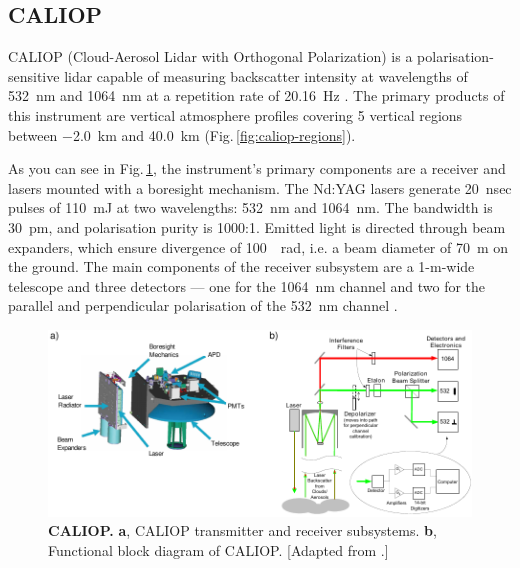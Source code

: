 \subsection{CALIOP}
CALIOP (Cloud-Aerosol Lidar with Orthogonal Polarization) is a
polarisation-sensitive lidar capable of measuring backscatter intensity at
wavelengths of \SI{532}{nm}
and \SI{1064}{nm} at a repetition rate of \SI{20.16}{Hz}
\citep{CALIPSO_Catalog2007}. The primary products of this instrument are
vertical atmosphere profiles covering 5 vertical regions between \SI{-2.0}{km} 
and \SI{40.0}{km} (Fig.\,\ref{fig:caliop-regions}).

As you can see in Fig.\,\ref{fig:caliop}, the instrument's primary components
are a receiver and lasers mounted with a boresight mechanism. The Nd:YAG lasers
generate \SI{20}{nsec} pulses of \SI{110}{mJ} at two wavelengths: \SI{532}{nm}
and \SI{1064}{nm}. The bandwidth is \SI{30}{pm}, and polarisation purity is
1000:1. Emitted light is directed through beam expanders, which ensure
divergence of \SI{100}{{\textmu}rad}, i.e. a beam diameter of \SI{70}{m} on the
ground. The main components of the receiver subsystem are a 1-m-wide telescope
and three detectors --- one for the \SI{1064}{nm} channel and two for the
parallel and perpendicular polarisation of the \SI{532}{nm} channel
\citep{PC-SCI-202.01}.

\begin{figure}[t]
\includegraphics[width=\textwidth]{images/caliop.pdf}
\caption[CALIOP]{\textbf{CALIOP.} \textbf{a}, CALIOP transmitter and receiver
subsystems. \textbf{b}, Functional block diagram of CALIOP.
[Adapted from \cite{PC-SCI-201}.]}
\label{fig:caliop}
\end{figure}

